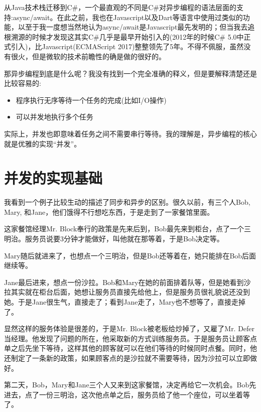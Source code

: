 \documentclass[12pt]{article}
\begin{document}
\makeblogtitle

从Java技术栈迁移到C\#，一个最直观的不同是C\#对异步编程的语法层面的支持:async/await。在此之前，我也在Javascript以及Dart等语言中使用过类似的功能，以至于我一度想当然地认为async/await是Javascript最先发明的；但当我去追根溯源的时候才发现这其实C\#几乎是最早开始引入的(2012年的时候C\# 5.0中正式引入)，比Javascript(ECMAScript 2017)整整领先了5年。不得不佩服，虽然没有很火，但是微软的技术前瞻性的确是做的很好的。

那异步编程到底是什么呢？我没有找到一个完全准确的释义，但是要解释清楚还是比较容易的:

\begin{itemize}
\tightlist
\item
  程序执行无序等待一个任务的完成(比如I/O操作)
\item
  可以并发地执行多个任务
\end{itemize}

实际上，并发也即意味着任务之间不需要串行等待。我的理解是，异步编程的核心就是优雅的实现``并发''。

\section{并发的实现基础}\label{ux5e76ux53d1ux7684ux5b9eux73b0ux57faux7840}

我看到一个例子比较生动的描述了同步和异步的区别。很久以前，有三个人Bob, Mary, 和Jane，他们饿得不行想吃东西，于是走到了一家餐馆里面。

这家餐馆经理Mr. Block奉行的政策是先来后到，Bob最先来到柜台，点了一个三明治。服务员说要3分钟才能做好，叫他就在那等着，于是Bob决定等。

Mary随后就进来了，也想点一个三明治，但是Bob还等着在，她只能排在Bob后面继续等。

Jane最后进来，想点一份沙拉。Bob和Mary在她的前面排着队等，但是她看到沙拉其实就在柜台后面，她想让服务员直接先给他上，但是服务员很礼貌说还没到她。于是Jane很生气，直接走了；看到Jane走了，Mary也不想等了，直接走掉了。

显然这样的服务体验是很差的，于是Mr. Block被老板给炒掉了，又雇了Mr. Defer当经理。他发现了问题的所在，他采取新的方式训练服务员。于是服务员让顾客点单之后先坐下等待，这样其他的顾客就可以在他们等待的时候同时点餐。同时，他还制定了一条新的政策，如果顾客点的是沙拉就不需要等待，因为沙拉可以立即做好。

第二天，Bob，Mary和Jane三个人又来到这家餐馆，决定再给它一次机会。Bob先进去，点了一份三明治，这次他点单之后，服务员给了他一个座位，可以坐着等了。
\end{document}
